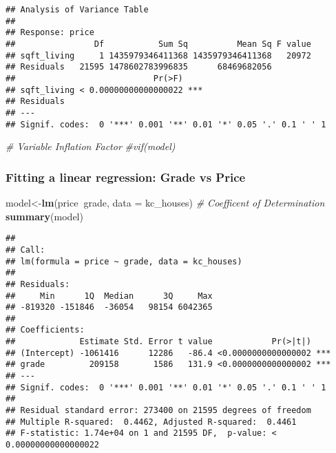 \documentclass[]{article}
\newenvironment{Shaded}{\begin{snugshade}}{\end{snugshade}}
\newcommand{\CommentTok}[1]{\textcolor[rgb]{0.56,0.35,0.01}{\textit{#1}}}
\newcommand{\DataTypeTok}[1]{\textcolor[rgb]{0.13,0.29,0.53}{#1}}
\newcommand{\KeywordTok}[1]{\textcolor[rgb]{0.13,0.29,0.53}{\textbf{#1}}}
\newcommand{\NormalTok}[1]{#1}
\newcommand{\OperatorTok}[1]{\textcolor[rgb]{0.81,0.36,0.00}{\textbf{#1}}}
\begin{document}
\begin{verbatim}
## Analysis of Variance Table
## 
## Response: price
##                Df           Sum Sq          Mean Sq F value
## sqft_living     1 1435979346411368 1435979346411368   20972
## Residuals   21595 1478602783996835      68469682056        
##                            Pr(>F)    
## sqft_living < 0.00000000000000022 ***
## Residuals                            
## ---
## Signif. codes:  0 '***' 0.001 '**' 0.01 '*' 0.05 '.' 0.1 ' ' 1
\end{verbatim}

\begin{Shaded}
\begin{Highlighting}[]
\CommentTok{# Variable Inflation Factor}
\CommentTok{#vif(model)}
\end{Highlighting}
\end{Shaded}

\hypertarget{fitting-a-linear-regression-grade-vs-price}{%
\subsubsection{Fitting a linear regression: Grade vs
Price}\label{fitting-a-linear-regression-grade-vs-price}}

\begin{Shaded}
\begin{Highlighting}[]
\NormalTok{model<-}\KeywordTok{lm}\NormalTok{(price}\OperatorTok{~}\NormalTok{grade, }\DataTypeTok{data =}\NormalTok{ kc_houses)}
\CommentTok{# Coefficent of Determination}
\KeywordTok{summary}\NormalTok{(model)}
\end{Highlighting}
\end{Shaded}

\begin{verbatim}
## 
## Call:
## lm(formula = price ~ grade, data = kc_houses)
## 
## Residuals:
##     Min      1Q  Median      3Q     Max 
## -819320 -151846  -36054   98154 6042365 
## 
## Coefficients:
##             Estimate Std. Error t value            Pr(>|t|)    
## (Intercept) -1061416      12286   -86.4 <0.0000000000000002 ***
## grade         209158       1586   131.9 <0.0000000000000002 ***
## ---
## Signif. codes:  0 '***' 0.001 '**' 0.01 '*' 0.05 '.' 0.1 ' ' 1
## 
## Residual standard error: 273400 on 21595 degrees of freedom
## Multiple R-squared:  0.4462, Adjusted R-squared:  0.4461 
## F-statistic: 1.74e+04 on 1 and 21595 DF,  p-value: < 0.00000000000000022
\end{verbatim}
\end{document}
